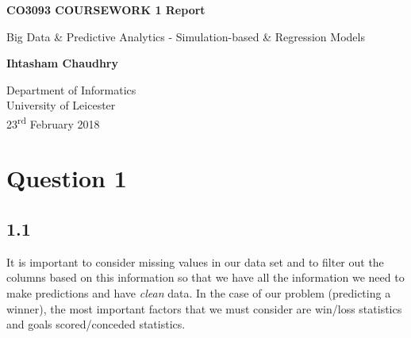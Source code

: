 \documentclass[12pt]{report}
\newcommand{\ts}{\textsuperscript}
\begin{document}
\begin{titlepage}
    \begin{center}
        \vspace*{1cm}
        
        \textbf{CO3093 COURSEWORK 1 Report}
        
        \vspace{0.5cm}
		Big Data \& Predictive Analytics - Simulation-based \& Regression Models
        
        \vspace{1.5cm}
        
        \textbf{Ihtasham Chaudhry}
        
        \vfill
        
        \vspace{0.8cm}
                
        Department of Informatics\\
        University of Leicester\\
        23\ts{rd} February 2018
        
    \end{center}
\end{titlepage}

\newpage

\section{Question 1}

\vspace{0.5cm}

\subsection{1.1}

\vspace{0.5cm}

It is important to consider missing values in our data set and to filter out the columns based on this information so that we have all the information we need to make predictions and have \emph{clean} data. In the case of our problem (predicting a winner), the most important factors that we must consider are win/loss statistics and goals scored/conceded statistics.
\end{document}
